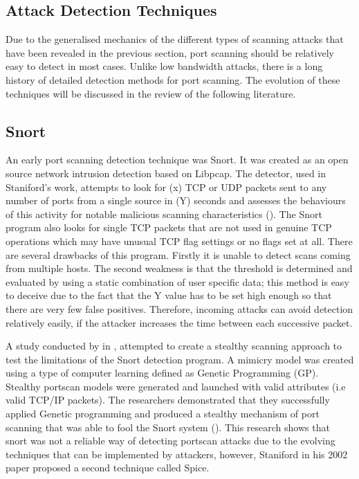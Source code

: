 \subsection{Attack Detection Techniques}

Due to the generalised mechanics of the different types of scanning attacks that have been revealed in the previous section, port scanning should be relatively easy to detect in most cases. Unlike low bandwidth attacks, there is a long history of detailed detection methods for port scanning. The evolution of these techniques will be discussed in the review of the following literature.

\subsection{Snort}

An early port scanning detection technique was Snort. It was created as an open source network intrusion detection based on Libpcap. The detector, used in Staniford's work, attempts to look for (x) TCP or UDP packets sent to any number of ports from a single source in (Y) seconds and assesses the behaviours of this activity for notable malicious scanning characteristics (\cite{staniford2002practical}). The Snort program also looks for single TCP packets that are not used in genuine TCP operations which may have unusual TCP flag settings or no flags set at all. There are several drawbacks of this program. Firstly it is unable to detect scans coming from multiple hosts. The second weakness is that the threshold is determined  and evaluated by using a static combination of user specific data; this method is easy to deceive due to the fact that the Y value has to be set high enough so that there are very few false positives. Therefore, incoming attacks can avoid detection relatively easily, if the attacker increases the time between each successive packet.

A study conducted by \citeauthor{laroche2009evolving} in \citeyear{laroche2009evolving}, attempted to create a stealthy scanning approach to test the limitations of the Snort detection program. A mimicry model was created using a type of computer learning defined as Genetic Programming (GP). Stealthy portscan models were generated and launched with valid attributes (i.e valid TCP/IP packets). The researchers demonstrated that they successfully applied Genetic programming and produced a stealthy mechanism of port scanning that was able to fool the Snort system (\cite{laroche2009evolving}). This research shows that snort was not a reliable way of detecting portscan attacks due to the evolving techniques that can be implemented by attackers, however, Staniford in his 2002 paper proposed a second technique called Spice.
 
